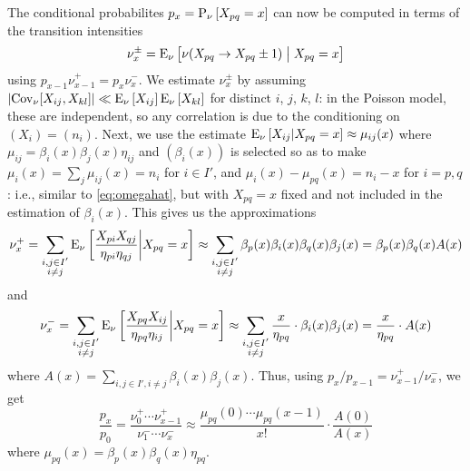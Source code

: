 \documentclass{myaptpub}%
\newcommand\Prob{\sP}
\newcommand\Prt[1]{\Prob_\nu\left[#1\right]}%
\newcommand\Exps[2]{\sE_{#1}\left[#2\right]}
\newcommand\Cov{\mathop{\mathrm{Cov}}}
\newcommand\bigmid{\bigm|}
\newcommand\Transition[2]{\nu(#1\rightarrow#2)}
\begin{document}
The conditional probabilites $p_x=\Prt{X_{pq}=x}$ can now be computed in terms of the transition intensities
\begin{equation}\nonumber
\nu^\pm_x=\Exps{\nu}{\Transition{X_{pq}}{X_{pq}\pm1}\bigmid X_{pq}=x}
\end{equation}
using $p_{x-1}\nu^+_{x-1}=p_x\nu^-_x$. We estimate $\nu^\pm_x$ by assuming
$\left|\Cov_{\nu}[X_{ij},X_{kl}]\right|\ll\Exps{\nu}{X_{ij}}\Exps{\nu}{X_{kl}}$
for distinct $i$, $j$, $k$, $l$: in the Poisson model, these are independent, so any correlation is due to the conditioning on $(X_i)=(n_i)$. Next, we use the estimate
$\Exps{\nu}{X_{ij}|X_{pq}=x}\approx\mu_{ij}(x)$
where $\mu_{ij}=\beta_i(x)\beta_j(x)\eta_{ij}$ and $(\beta_i(x))$ is selected so as to make $\mu_i(x)=\sum_j\mu_{ij}(x)=n_i$ for $i\in I'$, and $\mu_i(x)-\mu_{pq}(x)=n_i-x$ for $i=p,q$: i.e., similar to \eqref{eq:omegahat}, but with $X_{pq}=x$ fixed and not included in the estimation of $\beta_i(x)$. This gives us the approximations
\begin{equation}\nonumber
\nu^+_x
=\sum_{\substack{i,j\in I'\\ i\not=j}}\Exps{\nu}{\frac{X_{pi}X_{qj}}{\eta_{pi}\eta_{qj}}\middle| X_{pq}=x}
\approx\sum_{\substack{i,j\in I'\\ i\not=j}}\beta_p(x)\beta_i(x)\beta_q(x)\beta_j(x)
=\beta_p(x)\beta_q(x)A(x)
\end{equation}
and
\begin{equation}\nonumber
\nu^-_x
=\sum_{\substack{i,j\in I'\\ i\not=j}}\Exps{\nu}{\frac{X_{pq}X_{ij}}{\eta_{pq}\eta_{ij}}\middle| X_{pq}=x}
\approx\sum_{\substack{i,j\in I'\\ i\not=j}}\frac{x}{\eta_{pq}}\cdot \beta_i(x)\beta_j(x)
=\frac{x}{\eta_{pq}}\cdot A(x)
\end{equation}
where $A(x)=\sum_{i,j\in I', i\not=j}\beta_i(x)\beta_j(x)$. Thus, using $p_x/p_{x-1}=\nu^+_{x-1}/\nu^-_x$, we get
\begin{equation}\label{eq:px-expr}
\frac{p_x}{p_0}=\frac{\nu^+_0\cdots\nu^+_{x-1}}{\nu^-_1\cdots\nu^-_{x}}
\approx\frac{\mu_{pq}(0)\cdots\mu_{pq}(x-1)}{x!}\cdot\frac{A(0)}{A(x)}
\end{equation}
where $\mu_{pq}(x)=\beta_p(x)\beta_q(x)\eta_{pq}$.

\end{document}
